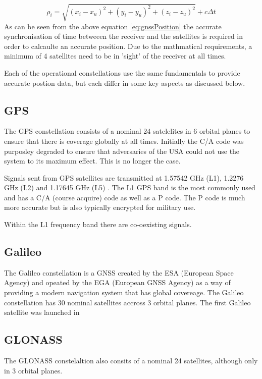 \begin{equation} \label{eq:gnssPosition} 
    \rho_i = \sqrt{(x_i - x_u)^2 + (y_i - y_u)^2 + (z_i - z_u)^2} + c \Delta t
\end{equation}
As can be seen from the above equation \ref{eq:gnssPosition} the accurate synchronisation of time betweeen the receiver and the satellites is required in order to
calcaulte an accurate position. Due to the mathmatical requirements, a minimum of 4 satellites need to be in 'sight' of the receiver at all times.

Each of the operational constellations use the same fundamentals to provide accurate postion data, but each differ in some key aspects as discussed below.

\subsection{GPS} \label{subsec:GNSS_GPSIntro}
The GPS constellation consists of a nominal 24 satelelites in 6 orbital planes to ensure that there is coverage globally at all times. Initially the C/A code was
purposley degraded to ensure that adversaries of the USA could not use the system to its maximum effect. This is no longer the case. 

Signals sent from GPS satellites
are transmitted at 1.57542 GHz (L1), 1.2276 GHz (L2) and 1.17645 GHz (L5) .
The L1 GPS band is the most commonly used and has a C/A (course acquire) code as well as a P code. The P code is much more accurate but is also typically encrypted for
military use.

Within the L1 frequency band there are co-oexisting signals. 

\subsection{Galileo} \label{subsec:GNSS_GalileoIntro}
The Galileo constellation is a GNSS created by the ESA (European Space Agency) and opeated by the EGA (European GNSS Agency) as a way of providing a modern navigation
system that has global covereage. The Galileo constellation has 30 nominal satellites accross 3 orbital planes. The first Galileo satellite was launched in 

\subsection{GLONASS} \label{subsec:GNSS_GLONASSIntro}
The GLONASS constelaltion also consits of a nominal 24 satellites, although only in 3 orbital planes. 

